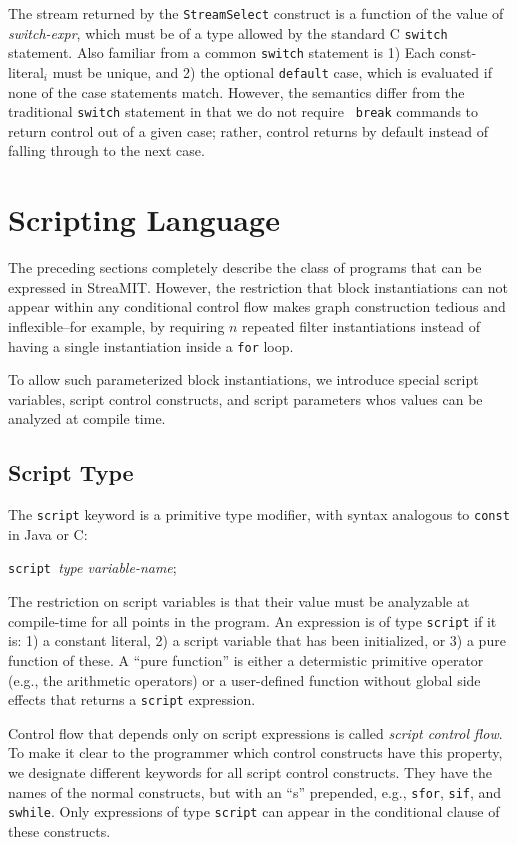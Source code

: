 \documentclass[draft]{article}
\begin{document}
The stream returned by the {\tt StreamSelect} construct is a function
of the value of {\it switch-expr}, which must be of a type allowed by
the standard C {\tt switch} statement.  Also familiar from a common
{\tt switch} statement is 1) Each const-literal$_i$ must be unique,
and 2) the optional {\tt default} case, which is evaluated if none of
the case statements match.  However, the semantics differ from the
traditional {\tt switch} statement in that we do not require {\tt
break} commands to return control out of a given case; rather, control
returns by default instead of falling through to the next case.

\section{Scripting Language}
\label{sec:script}

The preceding sections completely describe the class of programs that
can be expressed in StreaMIT.  However, the restriction that block
instantiations can not appear within any conditional control flow
makes graph construction tedious and inflexible--for example, by
requiring $n$ repeated filter instantiations instead of having a
single instantiation inside a {\tt for} loop.

To allow such parameterized block instantiations, we introduce special
script variables, script control constructs, and script parameters
whos values can be analyzed at compile time.

\subsection{Script Type}

The {\tt script} keyword is a primitive type modifier, with syntax
analogous to {\tt const} in Java or C:

\medskip
{\tt script }{\it type variable-name};
\medskip

The restriction on script variables is that their value must be
analyzable at compile-time for all points in the program.  An
expression is of type {\tt script} if it is: 1) a constant literal, 2)
a script variable that has been initialized, or 3) a pure function of
these.  A ``pure function'' is either a determistic primitive operator
(e.g., the arithmetic operators) or a user-defined function without
global side effects that returns a {\tt script} expression.

Control flow that depends only on script expressions is called {\it
script control flow}.  To make it clear to the programmer which
control constructs have this property, we designate different keywords
for all script control constructs.  They have the names of the normal
constructs, but with an ``s'' prepended, e.g., {\tt sfor}, {\tt sif},
and {\tt swhile}.  Only expressions of type {\tt script} can appear in
the conditional clause of these constructs.
\end{document}
